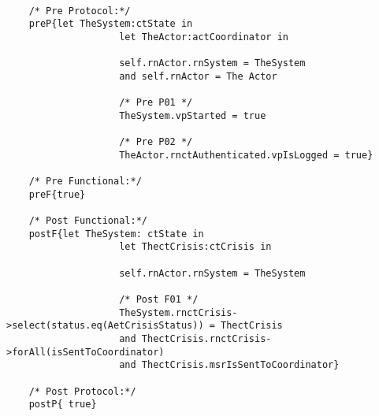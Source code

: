 	\scriptsize
	\vspace{0.5cm}
	\begin{lstlisting}[style=MessirStyle,firstnumber=auto,captionpos=b,caption={\msrmessir (MCL-oriented) specification of the operation \emph{oeGetCrisisSet}.},label=OM-actCoordinator-oeGetCrisisSet-MCL-LST]

	/* Pre Protocol:*/ 
	preP{let TheSystem:ctState in
					let TheActor:actCoordinator in
					
					self.rnActor.rnSystem = TheSystem
					and self.rnActor = The Actor
					
					/* Pre P01 */
					TheSystem.vpStarted = true
					
					/* Pre P02 */
					TheActor.rnctAuthenticated.vpIsLogged = true}
	
	/* Pre Functional:*/
	preF{true}
	
	/* Post Functional:*/ 
	postF{let TheSystem: ctState in
					let ThectCrisis:ctCrisis in
					
					self.rnActor.rnSystem = TheSystem
					
					/* Post F01 */
					TheSystem.rnctCrisis->select(status.eq(AetCrisisStatus)) = ThectCrisis
					and ThectCrisis.rnctCrisis->forAll(isSentToCoordinator)
					and ThectCrisis.msrIsSentToCoordinator}
	
	/* Post Protocol:*/ 
	postP{ true}
	
	\end{lstlisting}
	\normalsize 
	
	
	
	





